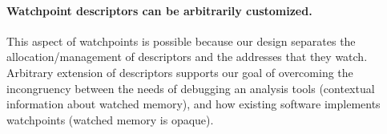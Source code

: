 
\paragraph{Watchpoint descriptors can be arbitrarily customized.} This aspect of watchpoints is possible because our design separates the allocation/management of descriptors and the addresses that they watch. Arbitrary extension of descriptors supports our goal of overcoming the incongruency between the needs of debugging an analysis tools (contextual information about watched memory), and how existing software implements watchpoints (watched memory is opaque).




